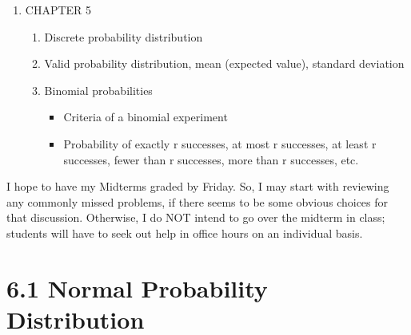 \documentclass{article}
\begin{document}
\begin{enumerate}
\begin{enumerate}
\begin{itemize}
                \end{itemize}
                
        \end{enumerate}
        
    \item CHAPTER 5 
    
        \begin{enumerate}
        
            \item Discrete probability distribution
            
            \item Valid probability distribution, mean (expected value), standard deviation
            
            \item Binomial probabilities
            
                \begin{itemize}
                
                    \item Criteria of a binomial experiment
                    
                    \item Probability of exactly r successes, at most r successes, at least r successes, fewer than r successes, more than r successes, etc.
                    
                \end{itemize}
        \end{enumerate}
        
\end{enumerate}

\newpage


I hope to have my Midterms graded by Friday. So, I may start with reviewing any commonly missed problems, if there seems to be some obvious choices for that discussion. Otherwise, I do NOT intend to go over the midterm in class; students will have to seek out help in office hours on an individual basis.
 
\section*{6.1 Normal Probability Distribution}
\end{document}
